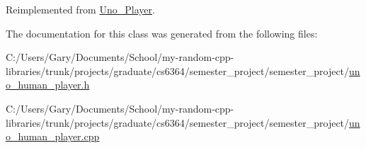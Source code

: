 \-Reimplemented from \hyperlink{class_uno___player_aa6e4a3177c39ee2572250b2dd4400a43}{\-Uno\-\_\-\-Player}.



\-The documentation for this class was generated from the following files\-:\begin{DoxyCompactItemize}
\item 
\-C\-:/\-Users/\-Gary/\-Documents/\-School/my-\/random-\/cpp-\/libraries/trunk/projects/graduate/cs6364/semester\-\_\-project/semester\-\_\-project/\hyperlink{uno__human__player_8h}{uno\-\_\-human\-\_\-player.\-h}\item 
\-C\-:/\-Users/\-Gary/\-Documents/\-School/my-\/random-\/cpp-\/libraries/trunk/projects/graduate/cs6364/semester\-\_\-project/semester\-\_\-project/\hyperlink{uno__human__player_8cpp}{uno\-\_\-human\-\_\-player.\-cpp}\end{DoxyCompactItemize}
